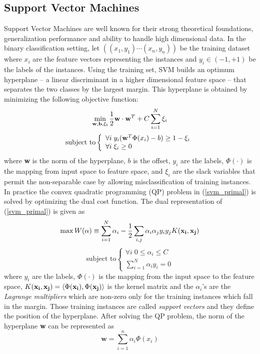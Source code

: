 \subsection{Support Vector Machines}
\label{SVMs}
Support Vector Machines \cite{Vapnik_1995} are well known for their strong theoretical foundations, generalization performance and ability to handle high dimensional data. In the binary classification setting, let $((x_{1}, y_{1})\cdots(x_{n}, y_{n}))$ be the training dataset where $x_i$ are the feature vectors representing the instances and  $y_i \in (-1,+1)$ be the labels of the instances.  Using the training set, SVM builds an optimum hyperplane -- a linear discriminant in a higher dimensional feature space -- that separates the two classes by the largest margin. This hyperplane is obtained by minimizing the following objective function:
\begin{equation}
\label{svm_primal}
\min_{{\bf{w}, b, \xi_{i}}}\frac{1}{2} {\bf w\cdot w}^T + C\sum_{i=1}^{N}\xi_i  \\
\end{equation}
\begin{equation}
\mbox{subject to}\left\{ \begin{array}{l} \forall i \; y_i({\bf
w}^T{\Phi(x_i)} - b)\geq 1-\xi_{i}\\ \forall i \; \xi_{i} \geq 0
\end{array} \right.
\end{equation}
where \textbf{w} is the norm of the hyperplane, $b$ is the  offset, $y_i$ are the labels, $\Phi(\cdot)$ is the mapping from input space to feature space, and $\xi_i$ are the slack variables that permit the non-separable case by allowing misclassification of training instances. In practice the convex quadratic programming (QP) problem in (\ref{svm_primal}) is solved by optimizing the dual cost function. The dual representation of (\ref{svm_primal}) is given as
\begin{equation}
\label{svm_dual}
\max W(\alpha) \equiv \sum_{i=1}^{N}\alpha_{i} - \frac{1}{2}\sum_{i,j}\alpha_i\alpha_{j}y_{i}y_{j}K({\bf x_i},{\bf x_j}) \\
\end{equation}
\begin{equation}
\mbox{subject to}\left\{ \begin{array}{l} \forall i\; 0 \leq \alpha_i \leq C\\ \sum_{i=1}^{N}\alpha_i y_i=0 \end{array} \right.
\end{equation}
where $y_i$ are the labels, $\Phi(\cdot)$ is the mapping from the input space to the feature space, $K({\bf x_i}, {\bf x_j})=\langle\Phi({\bf x_i}),\Phi({\bf x_j})\rangle$ is the kernel matrix and the $\alpha_i$'s are the \textit{Lagrange multipliers} which are non-zero only for the training instances which fall in the margin. Those training instances are called \textit{support vectors} and they define the position of the hyperplane. After solving the QP problem, the norm of the hyperplane \textbf{w} can be represented as
\begin{equation}
\label{svm_norm}
\textbf{w}=\sum_{i=1}^{n}\alpha_i\Phi(x_i)
\end{equation}

